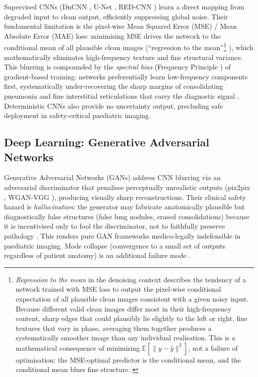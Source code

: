 \documentclass[12pt, a4paper, twoside, openright]{book}
\begin{document}
Supervised CNNs (DnCNN \cite{zhang_beyond_2017}, U-Net \cite{ronneberger_u-net_2015}, RED-CNN \cite{chen_low-dose_2017}) learn a direct mapping from degraded input to clean output, efficiently suppressing global noise. Their fundamental limitation is the pixel-wise Mean Squared Error (MSE) / Mean Absolute Error (MAE) loss: minimising MSE drives the network to the conditional mean of all plausible clean images (``regression to the mean''\footnote{\emph{Regression to the mean} in the denoising context describes the tendency of a network trained with MSE loss to output the pixel-wise conditional expectation of all plausible clean images consistent with a given noisy input. Because different valid clean images differ most in their high-frequency content, sharp edges that could plausibly lie slightly to the left or right, fine textures that vary in phase, averaging them together produces a systematically smoother image than any individual realisation. This is a mathematical consequence of minimising $\mathbb{E}[\|y - \hat{y}\|^2]$, not a failure of optimisation: the MSE-optimal predictor is the conditional mean, and the conditional mean blurs fine structure \cite{zhao_loss_2017}.} \cite{zhao_loss_2017}), which mathematically eliminates high-frequency texture and fine structural variance. This blurring is compounded by the \textit{spectral bias} (Frequency Principle \cite{rahaman_spectral_2019, xu_frequency_2020}) of gradient-based training: networks preferentially learn low-frequency components first, systematically under-recovering the sharp margins of consolidating pneumonia and fine interstitial reticulations that carry the diagnostic signal \cite{wang_high-frequency_2020}. Deterministic CNNs also provide no uncertainty output, precluding safe deployment in safety-critical paediatric imaging.

\subsection{Deep Learning: Generative Adversarial Networks}
\label{sec:intro:existing:gan}

Generative Adversarial Networks (GANs) \cite{goodfellow_generative_2014} address CNN blurring via an adversarial discriminator that penalises perceptually unrealistic outputs (pix2pix \cite{isola_image--image_2017}, WGAN-VGG \cite{yang_low-dose_2018}), producing visually sharp reconstructions. Their clinical safety hazard is \textit{hallucination}: the generator may fabricate anatomically plausible but diagnostically false structures (false lung nodules, erased consolidations) because it is incentivised only to fool the discriminator, not to faithfully preserve pathology \cite{bhadra_hallucinations_2021}. This renders pure GAN frameworks medico-legally indefensible in paediatric imaging. Mode collapse (convergence to a small set of outputs regardless of patient anatomy) is an additional failure mode \cite{goodfellow_generative_2014}.
\end{document}
